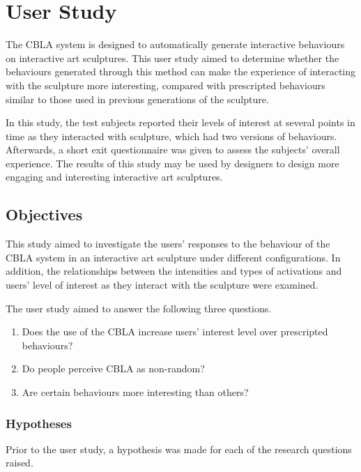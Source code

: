 \FloatBarrier
\section{User Study}\label{sec:user-study}

The CBLA system is designed to automatically generate interactive behaviours on interactive art sculptures. This user study aimed to determine whether the behaviours generated through this method can make the experience of interacting with the sculpture more interesting, compared with prescripted behaviours similar to those used in previous generations of the sculpture.

In this study, the test subjects reported their levels of interest at several points in time as they interacted with sculpture, which had two versions of behaviours. Afterwards, a short exit questionnaire was given to assess the subjects' overall experience. The results of this study may be used by designers to design more engaging and interesting interactive art sculptures. 

\subsection{Objectives}\label{sec:user-study-objectives}

This study aimed to investigate the users' responses to the behaviour of the CBLA system in an interactive art sculpture under different configurations. In addition, the relationships between the intensities and types of activations and users' level of interest as they interact with the sculpture were examined.

The user study aimed to answer the following three questions.

\begin{enumerate}
	\item Does the use of the CBLA increase users' interest level over prescripted behaviours?\label{itm:research-q1}
	\item Do people perceive CBLA as non-random?\label{itm:research-q2}
	\item Are certain behaviours  more interesting than others?\label{itm:research-q3}
\end{enumerate}


\subsubsection{Hypotheses}

Prior to the user study, a hypothesis was made for each of the research questions raised.

